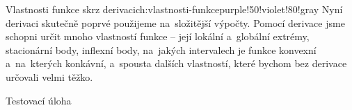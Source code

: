 \begin{chapterintro}{Vlastnosti funkce skrz derivaci}{ch:vlastnosti-funkce}{purple!50!violet!80!gray}{}
    Nyní derivaci skutečně poprvé použijeme na~složitější výpočty. Pomocí derivace
    jsme schopni určit mnoho vlastností funkce -- její lokální a~globální extrémy,
    stacionární body, inflexní body, na~jakých intervalech je funkce konvexní
    a~na~kterých konkávní, a~spousta dalších vlastností, které bychom bez derivace
    určovali velmi těžko.
\end{chapterintro}

\begin{exercise}
    Testovací úloha
\end{exercise}